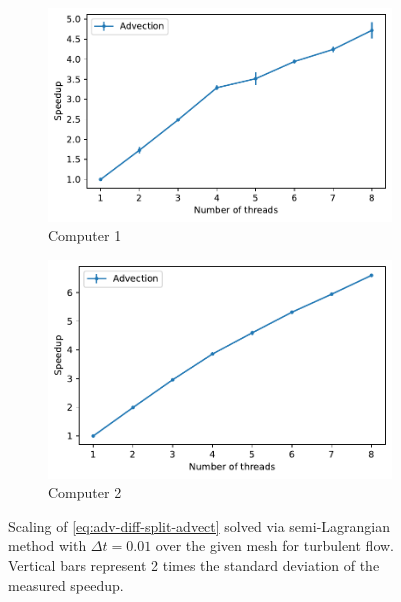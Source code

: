 \begin{figure}[H]
  \centering
  \begin{subfigure}[b]{0.49\textwidth}
      \centering
      \includegraphics[width=\textwidth]{Figures/TurbulentAdvectionSpeedUpC1.pdf}
      \caption{Computer 1}
  \end{subfigure}
  \begin{subfigure}[b]{0.49\textwidth}
      \centering
      \includegraphics[width=\textwidth]{Figures/TurbulentAdvectionSpeedUpC2.pdf}
      \caption{Computer 2}
  \end{subfigure}
\caption{Scaling of \cref{eq:adv-diff-split-advect} solved via semi-Lagrangian method with $\Delta t = 0.01$ over the given mesh for turbulent flow. Vertical bars represent 2 times the standard deviation of the measured speedup.}\label{fig:advection_speedup_graph_turbulent}
\end{figure}

